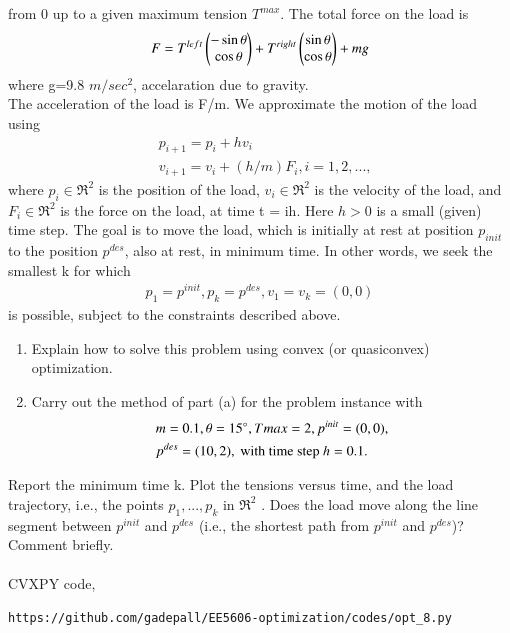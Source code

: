\documentclass[journal,12pt,twocolumn]{IEEEtran}
\begin{document}
\begin{enumerate}
from 0 up to a given maximum tension $T^{max}$. The total force on the load is
\begin{align}
F = T^{left}\begin{pmatrix}-\sin\theta \\ \cos\theta\end{pmatrix}+T^{right}\begin{pmatrix}\sin\theta \\ \cos\theta\end{pmatrix}+ mg
\end{align}
where g=9.8 $m/sec^2$, accelaration due to gravity.\\
The acceleration of the load is F/m. We approximate the motion of the load using
\begin{align}
&p_{i+1} = p_i + hv_i \nonumber\\ 
&v_{i+1} = v_i + (h/m)F_i, i = 1, 2, . . . , \nonumber
\end{align}
where $p_i \in \Re^2$ is the position of the load, $v_i \in \Re^2$ is the velocity of the load, and $F_i \in \Re^2$ is the force on the load, at time t = ih. Here $h > 0$ is a small (given) time step. The goal is to move the load, which is initially at rest at position $p_{init}$ to the position $p^{des}$, also at rest, in minimum time. In other words, we seek the smallest k for which
\begin{align}
p_1 = p^{init}, p_k = p^{des}, v_1 = v_k = (0, 0) \nonumber
\end{align}
is possible, subject to the constraints described above. \\
\begin{enumerate}
\item  Explain how to solve this problem using convex (or quasiconvex) optimization.
\item  Carry out the method of part (a) for the problem instance with
\begin{align}
&m = 0.1, \theta = 15\degree, T max = 2, p^{init} = (0, 0),\nonumber \\ & p^{des} = (10, 2), \text{ with time step } h = 0.1.\nonumber
\end{align}
\end{enumerate}
Report the minimum time k. Plot the tensions versus time, and the load trajectory, i.e., the points $p_1, . . . , p_k \text{ in } \Re^2$ . Does the load move along the line segment between $p^{init}$ and $p^{des}$ (i.e., the shortest path from $p^{init}$ and $p^{des}$)? Comment briefly.\\
\solution\\
CVXPY code,
\begin{lstlisting}
https://github.com/gadepall/EE5606-optimization/codes/opt_8.py
\end{lstlisting}

\end{enumerate}
\end{document}
